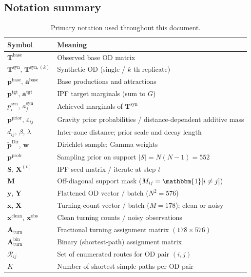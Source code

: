 \documentclass[11pt,a4paper]{report}
\newcommand{\Tbase}{\mathbf{T}^{\mathrm{base}}}
\newcommand{\Tsyn}{\mathbf{T}^{\mathrm{syn}}}
\newcommand{\Tsynk}[1]{\mathbf{T}^{\mathrm{syn},(#1)}}
\newcommand{\Xipf}[1]{\mathbf{X}^{(#1)}}
\newcommand{\mathbfp}{\mathbf{p}}
\newcommand{\mathbfa}{\mathbf{a}}
\newcommand{\mathbfS}{\mathbf{S}}
\newcommand{\mathbfM}{\mathbf{M}}
\newcommand{\mathbfy}{\mathbf{y}}
\newcommand{\mathbfx}{\mathbf{x}}
\newcommand{\mathbfX}{\mathbf{X}}
\newcommand{\mathbfY}{\mathbf{Y}}
\newcommand{\Aturn}{\mathbf{A}_{\mathrm{turn}}}
\newcommand{\mathbfw}{\mathbf{w}}
\begin{document}
\subsection{Notation summary}

\begin{table}[ht]
\centering
\caption{Primary notation used throughout this document.}
\label{tab:notation}
\small
\begin{tabular}{@{}ll@{}}
\toprule
\textbf{Symbol} & \textbf{Meaning} \\
\midrule
$\Tbase$ & Observed base OD matrix \\
$\Tsyn$, $\Tsynk{k}$ & Synthetic OD (single / $k$-th replicate) \\
$\mathbfp^{\mathrm{base}}$, $\mathbfa^{\mathrm{base}}$ & Base productions and attractions \\
$\mathbfp^{\mathrm{tgt}}$, $\mathbfa^{\mathrm{tgt}}$ & IPF target marginals (sum to $G$) \\
$p_i^{\mathrm{syn}}$, $a_j^{\mathrm{syn}}$ & Achieved marginals of $\Tsyn$ \\
$\mathbfp^{\mathrm{prior}}$, $\varepsilon_{ij}$ & Gravity prior probabilities / distance-dependent additive mass \\
$d_{ij}$, $\beta$, $\lambda$ & Inter-zone distance; prior scale and decay length \\
$\tilde{\mathbfp}^{\mathrm{Dir}}$, $\mathbfw$ & Dirichlet sample; Gamma weights \\
$\mathbfp^{\mathrm{prob}}$ & Sampling prior on support $|\mathcal{S}|=N(N-1)=552$ \\
$\mathbfS$, $\Xipf{t}$ & IPF seed matrix / iterate at step $t$ \\
$\mathbfM$ & Off-diagonal support mask ($M_{ij}=\mathbbm{1}[i\neq j]$) \\
$\mathbfy$, $\mathbfY$ & Flattened OD vector / batch ($N^2=576$) \\
$\mathbfx$, $\mathbfX$ & Turning-count vector / batch ($M=178$); clean or noisy \\
$\mathbfx^{\mathrm{clean}}$, $\mathbfx^{\mathrm{obs}}$ & Clean turning counts / noisy observations \\
$\Aturn$ & Fractional turning assignment matrix $(178 \times 576)$ \\
$\Aturn^{\mathrm{bin}}$ & Binary (shortest-path) assignment matrix \\
$\mathcal{R}_{ij}$ & Set of enumerated routes for OD pair $(i,j)$ \\
$K$ & Number of shortest simple paths per OD pair \\

\end{tabular}
\end{table}
\end{document}
